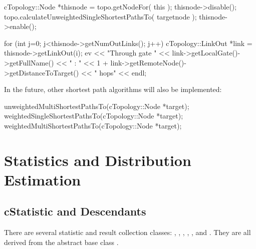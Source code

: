 \begin{cpp}
cTopology::Node *thisnode = topo.getNodeFor( this );
thisnode->disable();
topo.calculateUnweightedSingleShortestPathsTo( targetnode );
thisnode->enable();

for (int j=0; j<thisnode->getNumOutLinks(); j++)
{
  cTopology::LinkOut *link = thisnode->getLinkOut(i);
  ev << "Through gate " << link->getLocalGate()->getFullName() << " : "
     << 1 + link->getRemoteNode()->getDistanceToTarget() << " hops" << endl;
}
\end{cpp}

In the future, other shortest path algorithms will also be implemented:

\begin{cpp}
unweightedMultiShortestPathsTo(cTopology::Node *target);
weightedSingleShortestPathsTo(cTopology::Node *target);
weightedMultiShortestPathsTo(cTopology::Node *target);
\end{cpp}






\section{Statistics and Distribution Estimation}
\label{sec:ch-sim-lib:statistics}

\subsection{cStatistic and Descendants}

There are several statistic and result collection classes:
, , ,
, ,  and
. They are all derived from the abstract base class
.

